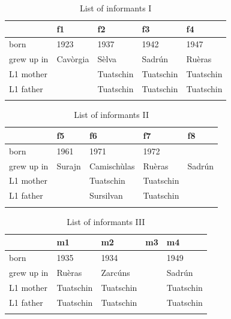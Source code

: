 \begin{table}
\caption{List of informants I}
\label{tab:informantsI}
 \begin{tabular}{lllll}
  \lsptoprule
  & f1 & f2 & f3 & f4\\
  \midrule
born & 1923 & 1937 & 1942 & 1947\\
grew up in & Cavòrgia & Sèlva & Sadrún & Ruèras \\
L1 mother & & Tuatschin & Tuatschin & Tuatschin \\
L1 father & & Tuatschin & Tuatschin & Tuatschin \\
 \lspbottomrule
 \end{tabular}
\end{table}

\begin{table}
\caption{List of informants II}
\label{tab:informantsII}
 \begin{tabular}{lllll}
  \lsptoprule
  & f5 & f6 & f7 & f8\\
  \midrule
born &  1961 & 1971 & 1972 &\\
grew up in &  Surajn &  Camischùlas &  Ruèras & Sadrún \\
L1 mother & & Tuatschin & Tuatschin\\
L1 father & & Sursilvan & Tuatschin\\
 \lspbottomrule
 \end{tabular}
\end{table}

\begin{table}
\caption{List of informants III}
\label{tab:informantsIII}
 \begin{tabular}{lllll}
  \lsptoprule
  & m1 & m2 & m3 & m4\\
  \midrule
born & 1935 & 1934 & & 1949 \\
grew up in & Ruèras & Zarcúns & & Sadrún\\
L1 mother & Tuatschin & Tuatschin & & Tuatschin\\
L1 father & Tuatschin & Tuatschin & & Tuatschin\\
 \lspbottomrule
 \end{tabular}
\end{table}

